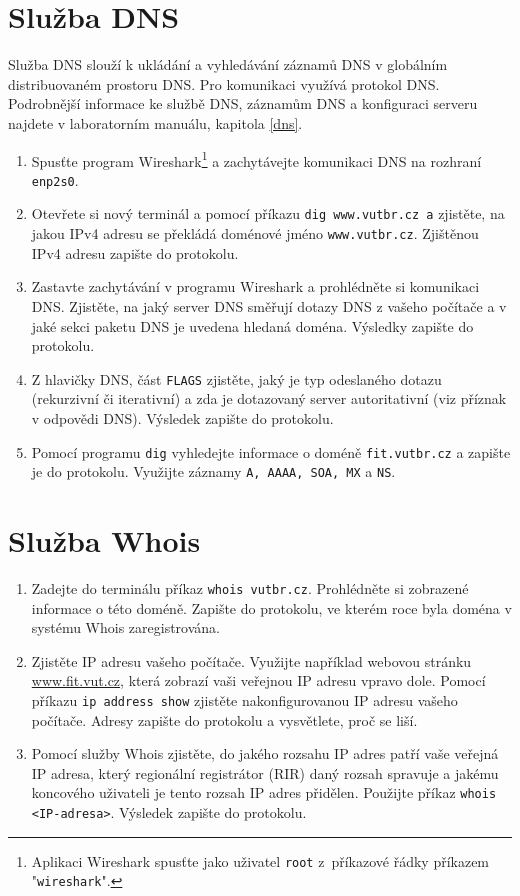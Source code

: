 \documentclass[a4paper,11pt]{article}
\begin{document}
\section{Služba DNS}
Služba DNS slouží k ukládání a vyhledávání záznamů DNS v globálním distribuovaném prostoru DNS. Pro komunikaci využívá protokol DNS. Podrobnější informace ke službě DNS, záznamům DNS a konfiguraci serveru najdete v laboratorním manuálu, kapitola \ref{dns}. 
\begin{enumerate}
    \item Spusťte program Wireshark\footnote{Aplikaci Wireshark spusťte jako uživatel \texttt{root} z~příkazové řádky příkazem "\texttt{wireshark}".} a zachytávejte komunikaci DNS na rozhraní \texttt{enp2s0}.
    \item Otevřete si nový terminál a pomocí příkazu \texttt{dig www.vutbr.cz a} zjistěte, na jakou IPv4 adresu se překládá doménové jméno \texttt{www.vutbr.cz}. Zjištěnou IPv4 adresu zapište do protokolu.
    \item Zastavte zachytávání v programu Wireshark a prohlédněte si komunikaci DNS. Zjistěte, na jaký server DNS směřují dotazy DNS z vašeho počítače a v jaké sekci paketu DNS je uvedena hledaná doména. Výsledky zapište do protokolu.
    \item Z hlavičky DNS, část \texttt{FLAGS} zjistěte, jaký je typ odeslaného dotazu (rekurzivní či iterativní) a zda je dotazovaný server autoritativní (viz příznak v odpovědi DNS). Výsledek zapište do protokolu.  
    \item Pomocí programu {\tt dig} vyhledejte informace o doméně {\tt fit.vutbr.cz} a zapište je do protokolu. Využijte záznamy \texttt{A, AAAA, SOA, MX} a {\tt NS}.
\end{enumerate}

\section{Služba Whois}
\begin{enumerate}
    \item Zadejte do terminálu příkaz \texttt{whois vutbr.cz}. Prohlédněte si zobrazené informace o této doméně. Zapište do protokolu, ve kterém roce byla doména v systému Whois zaregistrována.
    \item Zjistěte IP adresu vašeho počítače. Využijte například  webovou stránku \url{www.fit.vut.cz}, která zobrazí vaši veřejnou IP adresu vpravo dole. Pomocí příkazu \texttt{ip address show} zjistěte nakonfigurovanou IP adresu vašeho počítače. Adresy zapište do protokolu a vysvětlete, proč se liší. 
    \item Pomocí služby Whois zjistěte, do jakého rozsahu IP adres patří vaše veřejná IP adresa, který regionální registrátor (RIR) daný rozsah spravuje a jakému koncového uživateli je tento rozsah IP adres přidělen. Použijte příkaz \texttt{whois <IP-adresa>}. Výsledek zapište do protokolu.
\end{enumerate}
\end{document}

